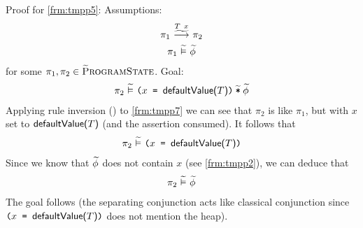 \begin{proofatend}
    Proof for \ref{frm:tmpp5}:
    Assumptions:
    \begin{gather}
    \label{frm:tmpp7}
    \gsstepConsume{\sDeclare {${T}$} {${x}$}}{\pi_1}{\pi_2}\\
    \label{frm:tmpp8}
    \evalgphiGen {\pi_1} {\grad{\phi}}
    \end{gather}
    for some $\pi_1, \pi_2 \in \textup{\textsc{\ensuremath{\widetilde{\text{P}}}rogramState}}$.
    Goal:
    \begin{gather}
    \pi_2 \,\,\widetilde{\vDash}\,\, \textup{\texttt{${\textup{\texttt{(${\textup{\texttt{${x}$}}}$ = ${\textup{\texttt{${\textup{\textmd{\textsf{defaultValue(${T}$)}}}}$}}}$)}}}$\:$\widetilde{\textup{\texttt{*}}}$\:$\widetilde{\phi}$}}
    \end{gather}
    Applying rule inversion () to \ref{frm:tmpp7} we can see that $\pi_2$ is like $\pi_1$, but with $x$ set to $\textup{\textmd{\textsf{defaultValue(${T}$)}}}$ (and the assertion consumed).
    It follows that
    \begin{gather}
    \pi_2 \,\,\widetilde{\vDash}\,\, \textup{\texttt{(${\textup{\texttt{${x}$}}}$ = ${\textup{\texttt{${\textup{\textmd{\textsf{defaultValue(${T}$)}}}}$}}}$)}}
    \end{gather}
    Since we know that $\widetilde{\phi}$ does not contain $x$ (see \ref{frm:tmpp2}), we can deduce that
    \begin{gather}
    \pi_2 \,\,\widetilde{\vDash}\,\, \widetilde{\phi}
    \end{gather}
    The goal follows (the separating conjunction acts like classical conjunction since ${\textup{\texttt{(${\textup{\texttt{${x}$}}}$ = ${\textup{\texttt{${\textup{\textmd{\textsf{defaultValue(${T}$)}}}}$}}}$)}}}$ does not mention the heap).
\end{proofatend}

